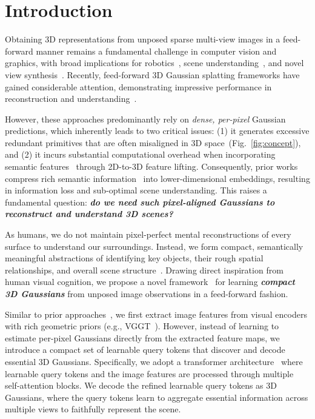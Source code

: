 \section{Introduction}
\label{sec:intro}
Obtaining 3D representations from unposed sparse multi-view images in a feed-forward manner remains a fundamental challenge in computer vision and graphics, with broad implications for robotics~\cite{shen2023distilled,han2025d}, scene understanding~\cite{fedele2025superdec}, and novel view synthesis~\cite{ye2024no}. Recently, feed-forward 3D Gaussian splatting frameworks have gained considerable attention, demonstrating impressive performance in reconstruction and understanding~\cite{ye2024no,huang2025no,hong2024pf3plat,fan2024large,sheng2025spatialsplat}.

However, these approaches predominantly rely on \textit{dense, per-pixel} Gaussian predictions, which inherently leads to two critical issues: (1) it generates excessive redundant primitives that are often misaligned in 3D space~(Fig.~\ref{fig:concept}), and (2) it incurs substantial computational overhead when incorporating semantic features~\cite{sheng2025spatialsplat,fan2024large} through 2D-to-3D feature lifting. Consequently, prior works compress rich semantic information~\cite{simeoni2025dinov3,oquab2023dinov2,kim2025seg4diff} into lower-dimensional embeddings, resulting in information loss and sub-optimal scene understanding. This raises a fundamental question: \textbf{\textit{do we need such pixel-aligned Gaussians to reconstruct and understand 3D scenes?}}

As humans, we do not maintain pixel-perfect mental reconstructions of every surface to understand our surroundings. Instead, we form compact, semantically meaningful abstractions of identifying key objects, their rough spatial relationships, and overall scene structure~\cite{burgess2006spatial,shepard1971mental}. Drawing direct inspiration from human visual cognition, we propose a novel framework \oursname\ for learning \textbf{\textit{compact 3D Gaussians}} from unposed image observations in a feed-forward fashion. 

Similar to prior approaches~\cite{ye2024no,huang2025no}, we first extract image features from visual encoders with rich geometric priors (e.g., VGGT~\cite{wang2025vggt}). However, instead of learning to estimate per-pixel Gaussians directly from the extracted feature maps, we introduce a compact set of learnable query tokens that discover and decode essential 3D Gaussians. Specifically, we adopt a transformer architecture~\cite{vaswani2017attention} where learnable query tokens and the image features are processed through multiple self-attention blocks. We decode the refined learnable query tokens as 3D Gaussians, where the query tokens learn to aggregate essential information across multiple views to faithfully represent the scene.


